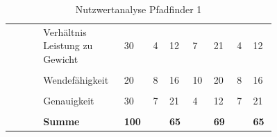 \documentclass[main.tex]{subfiles} %
\begin{document}
\begin{landscape}
\begin{table}[ht]
\begin{tabular}{|p{0.11\linewidth}|p{0.18\linewidth}|p{0.085\linewidth}|p{0.057\linewidth}|p{0.07\linewidth}|p{0.057\linewidth}|p{0.07\linewidth}|p{0.057\linewidth}|p{0.07\linewidth}|}
                                                      & Verhältnis Leistung zu Gewicht      & 30                                         & 4                                         & 12                                         & 7          & 21          & 4          & 12          \\[1pt]
            \cline{2-9}
                                                      &                                     &                                            &                                           &                                            &            &             &            &             \\[-9pt]
                                                      & Wendefähigkeit                      & 20                                         & 8                                         & 16                                         & 10         & 20          & 8          & 16          \\[1pt]
            \cline{2-9}
                                                      &                                     &                                            &                                           &                                            &            &             &            &             \\[-9pt]
                                                      & Genauigkeit                         & 30                                         & 7                                         & 21                                         & 4          & 12          & 7          & 21          \\[1pt]
            \cline{2-9}
                                                      &                                     &                                            &                                           &                                            &            &             &            &             \\[-9pt]
                                                      & \textbf{Summe}                      & \textbf{100}                               &                                           & \textbf{65}                                &            & \textbf{69} &            & \textbf{65} \\[1pt]
            \hline

        \end{tabular}
        \caption{Nutzwertanalyse Pfadfinder 1}
    \end{table}


\end{landscape}
\end{document}
